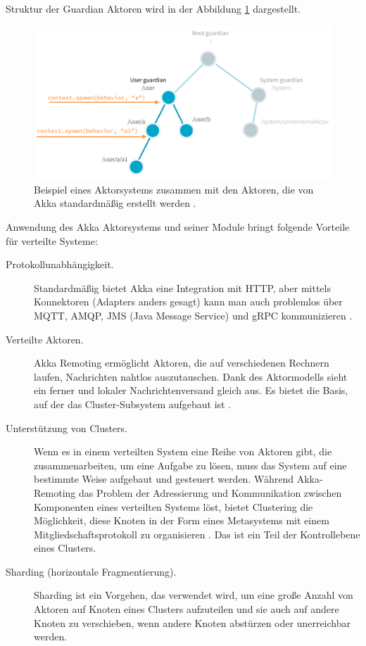Struktur der Guardian Aktoren wird in der Abbildung \ref{fig:akkaActors} dargestellt.

\begin{figure}
	\centering
	\includegraphics[width=0.7\linewidth]{images/3_akka_actors}
	\caption{Beispiel eines Aktorsystems zusammen mit den Aktoren, die von Akka standardmäßig erstellt werden \cite{akka}.}
	\label{fig:akkaActors}
\end{figure}

Anwendung des Akka Aktorsystems und seiner Module bringt folgende Vorteile für verteilte Systeme:

\begin{description} 
	\item[Protokollunabhängigkeit.] Standardmäßig bietet Akka eine Integration mit HTTP, aber mittels Konnektoren (Adapters anders gesagt) kann man auch problemlos über MQTT, AMQP, JMS (Java Message Service) und gRPC kommunizieren \cite{akka}.
	
	\item[Verteilte Aktoren.] Akka Remoting ermöglicht Aktoren, die auf verschiedenen Rechnern laufen, Nachrichten nahtlos auszutauschen. Dank des Aktormodells sieht ein ferner und lokaler Nachrichtenversand gleich aus. Es bietet die Basis, auf der das Cluster-Subsystem aufgebaut ist \cite{akka}.
	
	\item[Unterstützung von Clusters.] Wenn es in einem verteilten System eine Reihe von Aktoren gibt, die zusammenarbeiten, um eine Aufgabe zu lösen, muss das System auf eine bestimmte Weise aufgebaut und gesteuert werden. Während Akka-Remoting das Problem der Adressierung und Kommunikation zwischen Komponenten eines verteilten Systems löst, bietet Clustering die Möglichkeit, diese Knoten in der Form eines Metasystems mit einem Mitgliedschaftsprotokoll zu organisieren \cite{akka}. Das ist ein Teil der Kontrollebene eines Clusters.
	
	\item[Sharding (horizontale Fragmentierung).] Sharding ist ein Vorgehen, das verwendet wird, um eine große Anzahl von Aktoren auf Knoten eines Clusters aufzuteilen und sie auch auf andere Knoten zu verschieben, wenn andere Knoten abstürzen oder unerreichbar werden.
\end{description}

